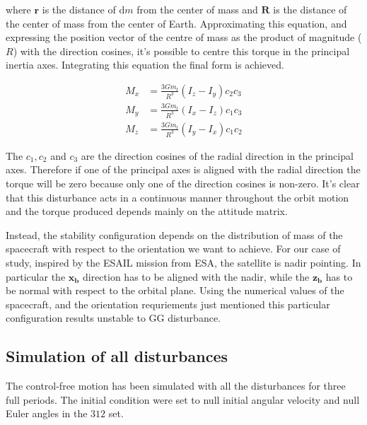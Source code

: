 where $\boldsymbol{r}$ is the distance of $\mathrm{d}m$ from the center of mass and $\boldsymbol{R}$ is the distance of the center of mass from the center of Earth.
Approximating this equation, and expressing the position vector of the centre of mass as the product of magnitude (\( R \)) with the direction cosines, 
it’s possible to centre this torque in the principal inertia axes. Integrating this equation the final form is achieved.

\begin{equation}
	\begin{aligned}
		M_x &= \frac{3Gm_t}{R^3} (I_z - I_y)c_2c_3 \\
		M_y &= \frac{3Gm_t}{R^3} (I_x - I_z)c_1c_3 \\
		M_z &= \frac{3Gm_t}{R^3} (I_y - I_x)c_1c_2
	\end{aligned}
\end{equation}


The \( c_1, c_2 \) and \( c_3 \) are the direction cosines of the radial direction in the principal axes. 
Therefore if one of the principal axes is aligned with the radial direction the torque will be zero because only one of the direction cosines is non-zero.
It's clear that this disturbance acts in a continuous manner throughout the orbit motion and the torque produced depends mainly on the attitude matrix.

Instead, the stability configuration depends on the distribution of mass of the spacecraft with respect to the orientation we want to achieve. For our case of study, 
inspired by the ESAIL mission from ESA, the satellite is nadir pointing. In particular the $\boldsymbol{x_b}$ direction has to be aligned with the nadir, while the $\boldsymbol{z_b}$ has to be normal with respect to the orbital plane. Using the numerical values of the spacecraft, and the orientation requriements just mentioned this particular configuration results unstable to GG disturbance.


\subsection{Simulation of all disturbances}
\label{subsec:sim_disturbances}


The control-free motion has been simulated with all the disturbances for three full periods. 
The initial condition were set to null initial angular velocity and 
null Euler angles in the $312$ set.

